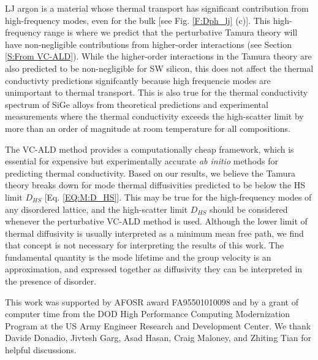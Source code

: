 \documentclass[aps,prb,onecolumn,preprint,footinbib,superscriptaddress,amsmath,amssymb,floatfix]{revtex4}
\begin{document}
LJ argon is a material whose thermal transport has significant 
contribution from high-frequency modes, even for the bulk 
[see Fig. \ref{F:Dph_lj} (c)]. 
This high-frequency range is where we predict that the 
perturbative Tamura theory   
will have non-negligible contributions from higher-order 
interactions (see Section \ref{S:From VC-ALD}). 
While the higher-order interactions in the 
Tamura theory are also predicted to be 
non-negligible for SW silicon, this does not affect the thermal 
conductivty predictions signifcantly because high frequencie modes  
are unimportant to thermal transport. This is also 
true for the thermal conductivity spectrum of SiGe alloys 
from theoretical predictions
\cite{abeles_lattice_1963,garg_role_2011,ward_intrinsic_2010} and 
experimental measurements where the thermal conductivity 
exceeds the high-scatter limit by more than
an order of magnitude at room temperature for all compositions.
\cite{cahill_lattice_1988,cahill_thermal_2004,
cahill_thermal_2005,cheaito_experimental_2012}

The VC-ALD method provides a computationally cheap framework, which is 
essential for expensive but experimentally accurate \emph{ab initio} 
methods for predicting thermal conductivity.
\cite{ward_intrinsic_2010,lindsay_thermal_2012,
garg_role_2011,
shiga_microscopic_2012,tian_phonon_2012,
shiomi_thermal_2011,esfarjani_heat_2011,
li_thermal_2012,luckyanova_coherent_2012} Based on our results, 
we believe the Tamura theory breaks down for mode thermal 
diffusivities predicted to be below the HS limit $D_{HS}$ 
[Eq. \eqref{EQ:M:D_HS}]. 
This may be true for the high-frequency modes of any disordered 
lattice, and the high-scatter limit $D_{HS}$ should be 
considered whenever the perturbative VC-ALD method is used.
Although the lower limit of thermal 
diffusivity is usually interpreted as a minimum mean free path,
\cite{kittel_interpretation_1949,graebner_phonon_1986,
cahill_lattice_1988,sheng_heat_1991} 
we find 
that concept is not necessary for interpreting the results of this work. 
The fundamental quantity is the mode lifetime and the group velocity 
is an approximation, and expressed together as diffusivity 
they can be interpreted in the presence of disorder.

\begin{acknowledgements}
This work was supported by AFOSR award FA95501010098 and by a grant 
of computer time from the DOD 
High Performance Computing Modernization Program at the US Army Engineer 
Research and Development Center. 
We thank Davide Donadio, Jivtesh Garg, Asad Hasan, Craig Maloney, 
and Zhiting Tian for helpful discussions.
\end{acknowledgements}
\end{document}
